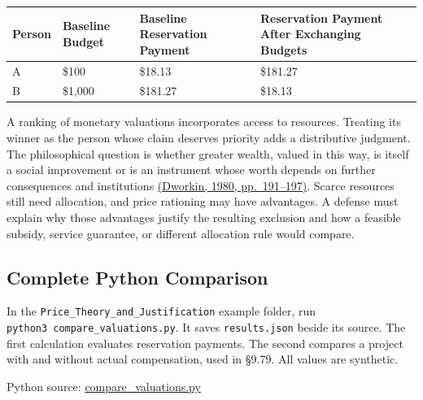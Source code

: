 \begin{table}[H]
\centering\small
\begin{tabular}{@{}
  >{\raggedright\arraybackslash}p{}
  >{\raggedleft\arraybackslash}p{}
  >{\raggedleft\arraybackslash}p{}
  >{\raggedleft\arraybackslash}p{}@{}}
\toprule
Person & Baseline Budget & Baseline Reservation Payment & Reservation
Payment After Exchanging Budgets \\
\midrule

A & \$100 & \$18.13 & \$181.27 \\
B & \$1,000 & \$181.27 & \$18.13 \\
\bottomrule
\end{tabular}
\end{table}

A ranking of monetary valuations incorporates access to resources.
Treating its winner as the person whose claim deserves priority adds a
distributive judgment. The philosophical question is whether greater
wealth, valued in this way, is itself a social improvement or is an
instrument whose worth depends on further consequences and institutions
\href{https://doi.org/10.1086/467636}{(Dworkin, 1980, pp.~191--197)}.
Scarce resources still need allocation, and price rationing may have
advantages. A defense must explain why those advantages justify the
resulting exclusion and how a feasible subsidy, service guarantee, or
different allocation rule would compare.

\hypertarget{M09-complete-python-comparison}{%
\subsection{Complete Python
Comparison}\label{M09-complete-python-comparison}}

\noindent \noindent In the \texttt{Price\_Theory\_and\_Justification} example
folder, run \texttt{python3\ compare\_valuations.py}. It saves
\texttt{results.json} beside its source. The first calculation evaluates
reservation payments. The second compares a project with and without
actual compensation, used in §9.79. All values are synthetic.

\FloatBarrier
{}
Python source:
\href{../03_Data_and_Code/Price_Theory_and_Justification/compare_valuations.py}{compare\_valuations.py}

